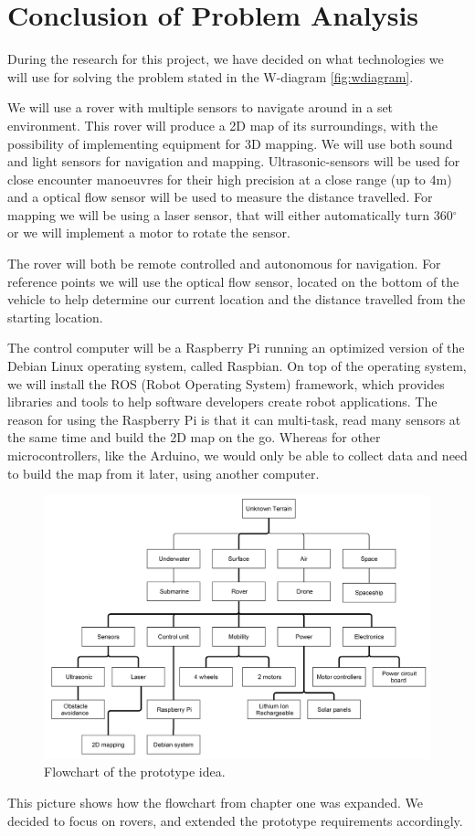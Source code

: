 \section{Conclusion of Problem Analysis}

During the research for this project, we have decided on what technologies we will use for solving the problem stated in the W-diagram \ref{fig:wdiagram}.

We will use a rover with multiple sensors to navigate around in a set environment. This rover will produce a 2D map of its surroundings, with the possibility of implementing equipment for 3D mapping. We will use both sound and light sensors for navigation and mapping. Ultrasonic-sensors will be used for close encounter manoeuvres for their high precision at a close range (up to 4m)\cite{hcsr40datesheet} and a optical flow sensor will be used to measure the distance travelled. For mapping we will be using a laser sensor, that will either automatically turn 360$^{\circ}$ or we will implement a motor to rotate the sensor.

The rover will both be remote controlled and autonomous for navigation. For reference points we will use the optical flow sensor, located on the bottom of the vehicle to help determine our current location and the distance travelled from the starting location.

The control computer will be a Raspberry Pi running an optimized version of the Debian Linux operating system, called Raspbian. On top of the operating system, we will install the ROS (Robot Operating System) framework, which provides libraries and tools to help software developers create robot applications\cite{ros}. %
The reason for using the Raspberry Pi is that it can multi-task, read many sensors at the same time and build the 2D map on the go. Whereas for other microcontrollers, like the Arduino, we would only be able to collect data and need to build the map from it later, using another computer.

\begin{figure}[H]
	\centering
	\includegraphics[scale=.1]{images/level3.png}
	\caption{Flowchart of the prototype idea.}
	\label{fig:level3}
\end{figure}

This picture shows how the flowchart from chapter one was expanded. We decided to focus on rovers, and extended the prototype requirements accordingly.

\clearpage
